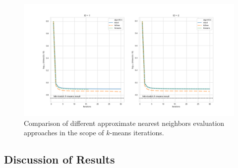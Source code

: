 \begin{frame}
	
	\begin{figure}
		\centering
		\includegraphics[width=1.0\linewidth]{../images/flann/comparison}
		\caption{\footnotesize Comparison of different approximate nearest neighbors evaluation approaches in the scope of $k$-means iterations.\footnotemark}
		\label{fig:comparison}
		
	\end{figure}
	
\end{frame}


\subsection{Discussion of Results}

